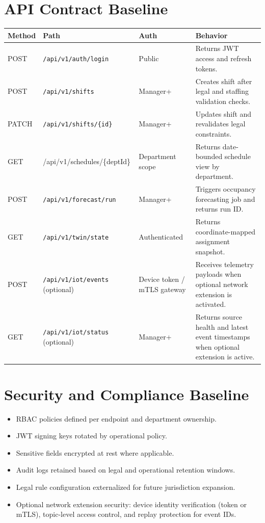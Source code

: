 \documentclass[11pt,a4paper]{article}
\newcommand{\thead}[1]{\textcolor{HeaderText}{\textbf{#1}}}
\begin{document}
\section{API Contract Baseline}
\begin{tabularx}{\textwidth}{P{0.14\textwidth}P{0.31\textwidth}P{0.18\textwidth}Y}
\toprule
{}
\thead{Method} & \thead{Path} & \thead{Auth} & \thead{Behavior} \\
\midrule
POST & \texttt{/api/v1/auth/login} & Public & Returns JWT access and refresh tokens. \\
POST & \texttt{/api/v1/shifts} & Manager+ & Creates shift after legal and staffing validation checks. \\
PATCH & \texttt{/api/v1/shifts/\{id\}} & Manager+ & Updates shift and revalidates legal constraints. \\
GET & /api/v1/schedules/\{deptId\} & Department scope & Returns date-bounded schedule view by department. \\
POST & \texttt{/api/v1/forecast/run} & Manager+ & Triggers occupancy forecasting job and returns run ID. \\
GET & \texttt{/api/v1/twin/state} & Authenticated & Returns coordinate-mapped assignment snapshot. \\
POST & \texttt{/api/v1/iot/events} (optional) & Device token / mTLS gateway & Receives telemetry payloads when optional network extension is activated. \\
GET & \texttt{/api/v1/iot/status} (optional) & Manager+ & Returns source health and latest event timestamps when optional extension is active. \\
\bottomrule
\end{tabularx}

\section{Security and Compliance Baseline}
\begin{itemize}
  \item RBAC policies defined per endpoint and department ownership.
  \item JWT signing keys rotated by operational policy.
  \item Sensitive fields encrypted at rest where applicable.
  \item Audit logs retained based on legal and operational retention windows.
  \item Legal rule configuration externalized for future jurisdiction expansion.
  \item Optional network extension security: device identity verification (token or mTLS), topic-level access control, and replay protection for event IDs.
\end{itemize}
\end{document}
